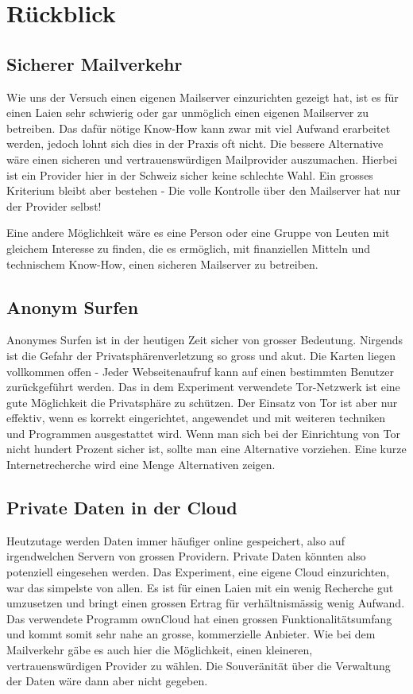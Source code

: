 \section{Rückblick}

\subsection{Sicherer Mailverkehr}

Wie uns der Versuch einen eigenen Mailserver einzurichten gezeigt hat, 
ist es für einen Laien sehr schwierig oder gar unmöglich einen eigenen Mailserver zu betreiben.
Das dafür nötige Know-How kann zwar mit viel Aufwand erarbeitet werden, jedoch lohnt sich dies in der Praxis oft nicht. 
Die bessere Alternative wäre einen sicheren und vertrauenswürdigen Mailprovider auszumachen. 
Hierbei ist ein Provider hier in der Schweiz sicher keine schlechte Wahl. 
Ein grosses Kriterium bleibt aber bestehen - Die volle Kontrolle über den Mailserver hat nur der Provider selbst!

Eine andere Möglichkeit wäre es eine Person oder eine Gruppe von Leuten mit gleichem Interesse zu finden, die es ermöglich,
mit finanziellen Mitteln und technischem Know-How, einen sicheren Mailserver zu betreiben.

\subsection{Anonym Surfen}

Anonymes Surfen ist in der heutigen Zeit sicher von grosser Bedeutung. 
Nirgends ist die Gefahr der Privatsphärenverletzung so gross und akut. 
Die Karten liegen vollkommen offen - Jeder Webseitenaufruf kann auf einen bestimmten Benutzer zurückgeführt werden.
Das in dem Experiment verwendete Tor-Netzwerk ist eine gute Möglichkeit die Privatsphäre zu schützen.
Der Einsatz von Tor ist aber nur effektiv, wenn es korrekt eingerichtet, angewendet und mit weiteren techniken und Programmen ausgestattet wird.
Wenn man sich bei der Einrichtung von Tor nicht hundert Prozent sicher ist, sollte man eine Alternative vorziehen.
Eine kurze Internetrecherche wird eine Menge Alternativen zeigen.

\subsection{Private Daten in der Cloud}

Heutzutage werden Daten immer häufiger online gespeichert, also auf irgendwelchen Servern von grossen Providern. 
Private Daten könnten also potenziell eingesehen werden. Das Experiment, eine eigene Cloud einzurichten, war das simpelste von allen. 
Es ist für einen Laien mit ein wenig Recherche gut umzusetzen und bringt einen grossen Ertrag für verhältnismässig wenig Aufwand.
Das verwendete Programm ownCloud hat einen grossen Funktionalitätsumfang und kommt somit sehr nahe an grosse, kommerzielle Anbieter.
Wie bei dem Mailverkehr gäbe es auch hier die Möglichkeit, einen kleineren, vertrauenswürdigen Provider zu wählen.
Die Souveränität über die Verwaltung der Daten wäre dann aber nicht gegeben.

